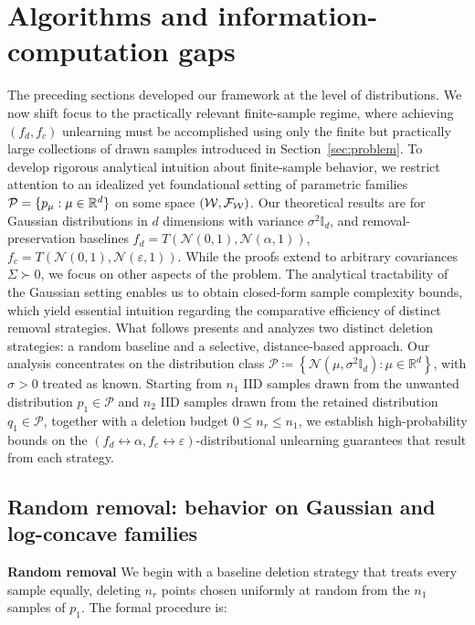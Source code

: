 \vspace{-4mm}
\section{Algorithms and information-computation gaps}
\vspace{-3mm}
\label{sec:theory}
The preceding sections developed our framework at the level of distributions. We now shift focus to the practically relevant finite-sample regime, where achieving $(f_d, f_c)$ unlearning must be accomplished using only the finite but practically large collections of drawn samples introduced in Section~\ref{sec:problem}. To develop rigorous analytical intuition about finite-sample behavior, we restrict attention to an idealized yet foundational setting of parametric families $\mathcal{P}= \{p_{\mu}: \mu\in \mathbb{R}^d\}$ on some space $(\mathcal{W}, \mathcal{F}_{\mathcal{W}})$. Our theoretical results are for Gaussian distributions in $d$ dimensions with variance $\sigma^2 \mathbb{I}_d$,  and removal-preservation baselines $f_d = T(\mathcal{N}(0,1), \mathcal{N}(\alpha, 1))$, $f_c = T(\mathcal{N}(0,1), \mathcal{N}(\varepsilon, 1))$. While the proofs extend to arbitrary covariances $\Sigma \succ 0$, we focus on other aspects of the problem. The analytical tractability of the Gaussian setting enables us to obtain closed-form sample complexity bounds, which yield essential intuition regarding the comparative efficiency of distinct removal strategies.  What follows presents and analyzes two distinct deletion strategies: a random baseline and a selective, distance-based approach. Our analysis concentrates on the distribution class $\mathcal{P} \coloneqq \left\{ \mathcal{N}(\mu, \sigma^2\mathbb{I}_d) \colon \mu \in \mathbb{R}^d \right\}$, with $\sigma > 0$ treated as known. Starting from $n_1$ IID samples drawn from the unwanted distribution $p_1 \in \mathcal{P}$ and $n_2$ IID samples drawn from the retained distribution $q_1 \in \mathcal{P}$, together with a deletion budget $0 \leq n_r \leq n_1$, we establish high-probability bounds on the $(f_d \leftrightarrow \alpha, f_c \leftrightarrow \varepsilon)$-distributional unlearning guarantees that result from each strategy. 

\vspace{-2mm}
\subsection{Random removal: behavior on Gaussian and log-concave families}
\vspace{-2mm}
\textbf{Random removal} We begin with a baseline deletion strategy that treats every sample equally, deleting $n_r$ points chosen uniformly at random from the $n_1$ samples of $p_1$. The formal procedure is:

